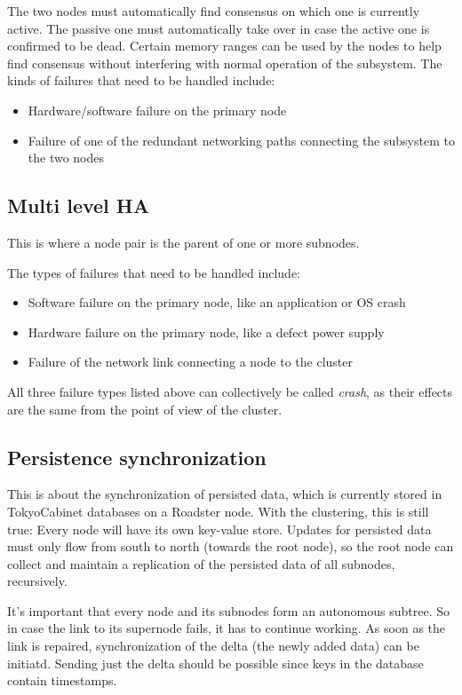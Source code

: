 The two nodes must automatically find consensus on which one is currently active. The
passive one must automatically take over in case the active one is confirmed to
be dead. Certain memory ranges can be used by the nodes to help find consensus
without interfering with normal operation of the subsystem. The kinds of
failures that need to be handled include:
\begin{itemize}
	\item Hardware/software failure on the primary node
	\item Failure of one of the redundant networking paths connecting the subsystem to the two nodes
\end{itemize}


\subsection{Multi level HA}
This is where a node pair is the parent of one or more subnodes.

The types of failures that need to be handled include:
\begin{itemize}
	\item Software failure on the primary node, like an application or OS crash
	\item Hardware failure on the primary node, like a defect power supply
	\item Failure of the network link connecting a node to the cluster
\end{itemize}

All three failure types listed above can collectively be called \emph{crash},
as their effects are the same from the point of view of the cluster.

\subsection{Persistence synchronization}
This is about the synchronization of persisted data, which is currently stored
in TokyoCabinet databases on a Roadster node. With the clustering, this is
still true: Every node will have its own key-value store. Updates for persisted
data must only flow from south to north (towards the root node), so the root
node can collect and maintain a replication of the persisted data of all
subnodes, recursively.

It's important that every node and its subnodes form an autonomous subtree. So
in case the link to its supernode fails, it has to continue working. As soon as
the link is repaired, synchronization of the delta (the newly added data) can
be initiatd. Sending just the delta should be possible since keys in the
database contain timestamps.

